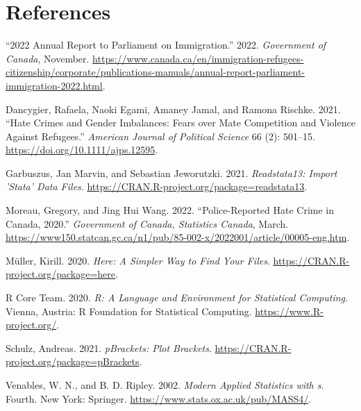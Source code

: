 \documentclass[
]{article}
\newlength{\cslhangindent}
\newlength{\cslentryspacingunit} %
\newenvironment{CSLReferences}[2] %
 {%
  \setlength{\parindent}{0pt}
  \ifodd #1
  \let\oldpar\par
  \def\par{\hangindent=\cslhangindent\oldpar}
  \fi
  \setlength{\parskip}{#2\cslentryspacingunit}
 }%
 {}
\begin{document}
\clearpage

\hypertarget{references}{%
\section*{References}\label{references}}

\hypertarget{refs}{}
\begin{CSLReferences}{1}{0}
\leavevmode{}%
{``2022 Annual Report to Parliament on Immigration.''} 2022.
\emph{Government of Canada}, November.
\url{https://www.canada.ca/en/immigration-refugees-citizenship/corporate/publications-manuals/annual-report-parliament-immigration-2022.html}.

\leavevmode{}%
Dancygier, Rafaela, Naoki Egami, Amaney Jamal, and Ramona Rischke. 2021.
{``Hate Crimes and Gender Imbalances: Fears over Mate Competition and
Violence Against Refugees.''} \emph{American Journal of Political
Science} 66 (2): 501--15. \url{https://doi.org/10.1111/ajps.12595}.

\leavevmode{}%
Garbuszus, Jan Marvin, and Sebastian Jeworutzki. 2021.
\emph{Readstata13: Import 'Stata' Data Files}.
\url{https://CRAN.R-project.org/package=readstata13}.

\leavevmode{}%
Moreau, Gregory, and Jing Hui Wang. 2022. {``Police-Reported Hate Crime
in Canada, 2020.''} \emph{Government of Canada, Statistics Canada},
March.
\url{https://www150.statcan.gc.ca/n1/pub/85-002-x/2022001/article/00005-eng.htm}.

\leavevmode{}%
Müller, Kirill. 2020. \emph{Here: A Simpler Way to Find Your Files}.
\url{https://CRAN.R-project.org/package=here}.

\leavevmode{}%
R Core Team. 2020. \emph{R: A Language and Environment for Statistical
Computing}. Vienna, Austria: R Foundation for Statistical Computing.
\url{https://www.R-project.org/}.

\leavevmode{}%
Schulz, Andreas. 2021. \emph{pBrackets: Plot Brackets}.
\url{https://CRAN.R-project.org/package=pBrackets}.

\leavevmode{}%
Venables, W. N., and B. D. Ripley. 2002. \emph{Modern Applied Statistics
with s}. Fourth. New York: Springer.
\url{https://www.stats.ox.ac.uk/pub/MASS4/}.


\end{CSLReferences}
\end{document}

